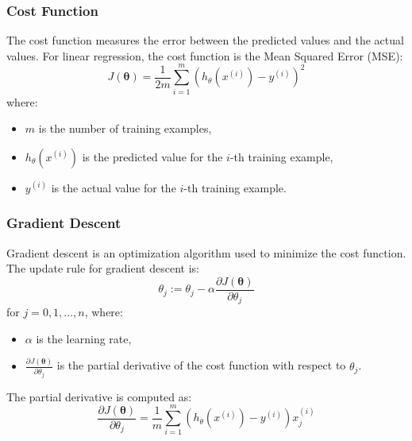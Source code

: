 \documentclass[11pt]{article}
\begin{document}
\subsubsection*{Cost Function}
The cost function measures the error between the predicted values and the actual values. For linear regression, the cost function is the Mean Squared Error (MSE):
\[
J(\bm{\theta}) = \frac{1}{2m} \sum_{i=1}^m \left( h_\theta(x^{(i)}) - y^{(i)} \right)^2
\]
where:
\begin{itemize}
    \item \( m \) is the number of training examples,
    \item \( h_\theta(x^{(i)}) \) is the predicted value for the \( i \)-th training example,
    \item \( y^{(i)} \) is the actual value for the \( i \)-th training example.
\end{itemize}

\subsubsection*{Gradient Descent}
Gradient descent is an optimization algorithm used to minimize the cost function. The update rule for gradient descent is:
\[
\theta_j := \theta_j - \alpha \frac{\partial J(\bm{\theta})}{\partial \theta_j}
\]
for \( j = 0, 1, \ldots, n \), where:
\begin{itemize}
    \item \( \alpha \) is the learning rate,
    \item \( \frac{\partial J(\bm{\theta})}{\partial \theta_j} \) is the partial derivative of the cost function with respect to \( \theta_j \).
\end{itemize}

The partial derivative is computed as:
\[
\frac{\partial J(\bm{\theta})}{\partial \theta_j} = \frac{1}{m} \sum_{i=1}^m \left( h_\theta(x^{(i)}) - y^{(i)} \right) x_j^{(i)}
\]
\end{document}
